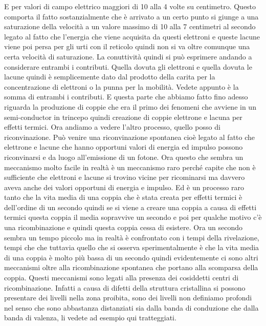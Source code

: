 E per valori di campo elettrico maggiori di 10 alla 4 volte su centimetro. Questo comporta il fatto sostanzialmente che è arrivato a un certo punto si giunge a una saturazione della velocità a un valore massimo di 10 alla 7 centimetri al secondo legato al fatto che l'energia che viene acquisita da questi elettroni e queste lacune viene poi persa per gli urti con il reticolo quindi non si va oltre comunque una certa velocità di saturazione. La conuttività quindi si può esprimere andando a considerare entrambi i contributi. Quella dovuta gli elettroni e quella dovuta le lacune quindi è semplicemente dato dal prodotto della carita per la concentrazione di elettroni o la punna per la mobilità. Vedete appunto è la somma di entrambi i contributi. E questa parte che abbiamo fatto fino adesso riguarda la produzione di coppie che era il primo dei fenomeni che avviene in un semi-conductor in trincepo quindi creazione di coppie elettrone e lacuna per effetti termici. Ora andiamo a vedere l'altro processo, quello posso di riconvinazione. Può venire una riconvinazione spontanea cioè legato al fatto che elettrone e lacune che hanno opportuni valori di energia ed impulso possono riconvinarsi e da luogo all'emissione di un fotone. Ora questo che sembra un meccanismo molto facile in realtà è un meccanismo raro perché capite che non è sufficiente che elettroni e lacune si trovino vicine per ricominarsi ma davvero aveva anche dei valori opportuni di energia e impulso. Ed è un processo raro tanto che la vita media di una coppia che è stata creata per effetti termici è dell'ordine di un secondo quindi se si viene a creare una coppia a causa di effetti termici questa coppia il media sopravvive un secondo e poi per qualche motivo c'è una ricombinazione e quindi questa coppia cessa di esistere. Ora un secondo sembra un tempo piccolo ma in realtà è confrontato con i tempi della rivelazione, tempi che che tuttavia quello che si osserva sperimentalmente è che la vita media di una coppia è molto più bassa di un secondo quindi evidentemente ci sono altri meccanismi oltre alla ricombinazione spontanea che portano alla scomparsa della coppia. Questi meccanismi sono legati alla presenza dei cosiddetti centri di ricombinazione. Infatti a causa di difetti della struttura cristallina si possono presentare dei livelli nella zona proibita, sono dei livelli non definiamo profondi nel senso che sono abbastanza distanziati sia dalla banda di conduzione che dalla banda di valenza, li vedete ad esempio qui tratteggiati.

